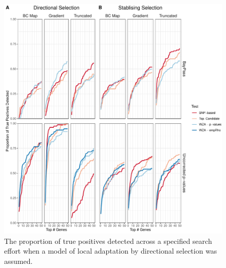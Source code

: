 \documentclass[11pt,twoside,lineno]{GSA_format}
\begin{document}
\begin{figure}[H]
  \includegraphics[width=\linewidth]{Plots/UncorrectedBayPassComparison_TruePositives.pdf} 
  \caption{The proportion of true positives detected across a specified search effort when a model of local adaptation  by directional selection was assumed.}

  \label{fig:truePosDirectional}
\end{figure}
\end{document}
